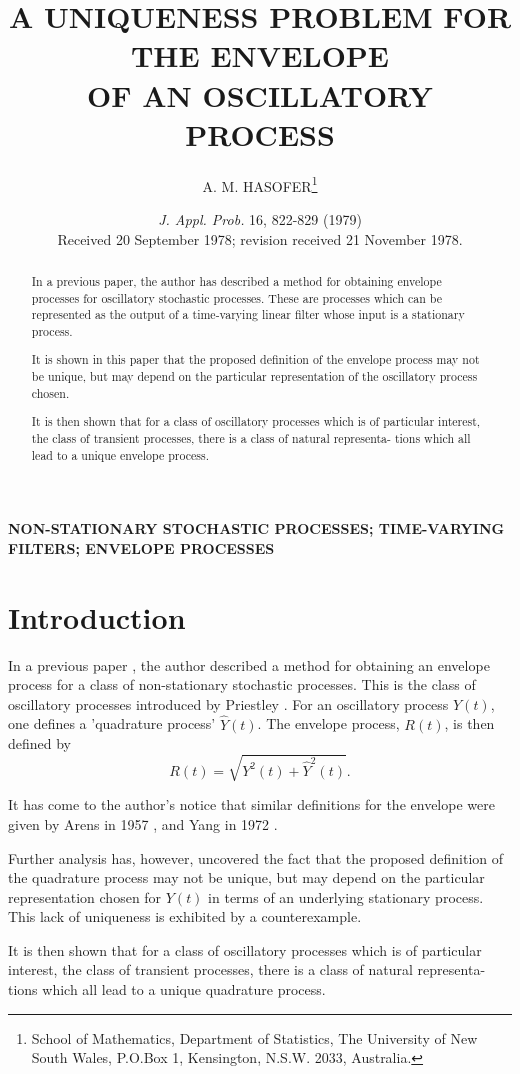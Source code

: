 \documentclass{article}
\title{A UNIQUENESS PROBLEM FOR THE ENVELOPE\\
OF AN OSCILLATORY PROCESS}
\author{A. M. HASOFER\thanks{School of Mathematics, Department of Statistics, The University of New South Wales, P.O.Box 1, Kensington, N.S.W. 2033, Australia.}}
\date{\textit{J. Appl. Prob.} 16, 822-829 (1979)\\Received 20 September 1978; revision received 21 November 1978.}
\begin{document}
\maketitle

\begin{abstract}
In a previous paper, the author has described a method for obtaining
envelope processes for oscillatory stochastic processes. These are processes
which can be represented as the output of a time-varying linear filter whose
input is a stationary process.

It is shown in this paper that the proposed definition of the envelope process
may not be unique, but may depend on the particular representation of the
oscillatory process chosen.

It is then shown that for a class of oscillatory processes which is of particular
interest, the class of transient processes, there is a class of natural representa-
tions which all lead to a unique envelope process.
\end{abstract}

\noindent\textbf{NON-STATIONARY STOCHASTIC PROCESSES; TIME-VARYING FILTERS; ENVELOPE PROCESSES}

\section{Introduction}
In a previous paper \cite{hasofer1978}, the author described a method for obtaining an
envelope process for a class of non-stationary stochastic processes. This is the
class of oscillatory processes introduced by Priestley \cite{priestley1965}. For an oscillatory
process $Y(t)$, one defines a 'quadrature process' $\hat{Y}(t)$. The envelope process,
$R(t)$, is then defined by
\begin{equation}
\label{eq:envelope}
R(t) = \sqrt{Y^2(t) + \hat{Y}^2(t)}.
\end{equation}

It has come to the author's notice that similar definitions for the envelope
were given by Arens in 1957 \cite{arens1957}, and Yang in 1972 \cite{yang1972}.

Further analysis has, however, uncovered the fact that the proposed definition
of the quadrature process may not be unique, but may depend on the particular
representation chosen for $Y(t)$ in terms of an underlying stationary process. This
lack of uniqueness is exhibited by a counterexample.

It is then shown that for a class of oscillatory processes which is of particular
interest, the class of transient processes, there is a class of natural representa-
tions which all lead to a unique quadrature process.
\end{document}
